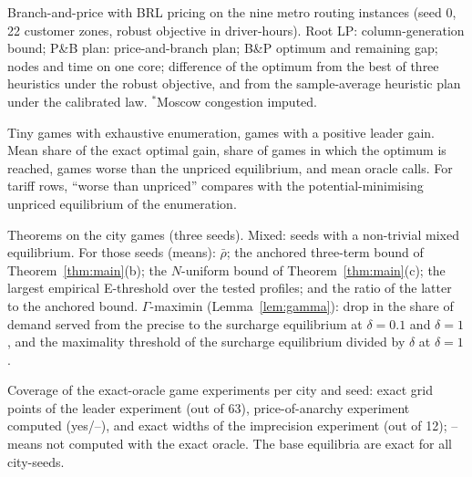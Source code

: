 \documentclass[preprint,12pt]{elsarticle}
\theoremstyle{definition}
\theoremstyle{remark}
\begin{document}
\begin{table}[h]\centering\small
\caption{Branch-and-price with BRL pricing on the nine metro routing instances (seed 0, 22 customer zones, robust objective in driver-hours). Root LP: column-generation bound; P\&B plan: price-and-branch plan; B\&P optimum and remaining gap; nodes and time on one core; difference of the optimum from the best of three heuristics under the robust objective, and from the sample-average heuristic plan under the calibrated law. $^*$Moscow congestion imputed.}\label{tab:brl-metro}
\end{table}

\begin{table}[h]\centering\small
\caption{Tiny games with exhaustive enumeration, games with a positive leader gain. Mean share of the exact optimal gain, share of games in which the optimum is reached, games worse than the unpriced equilibrium, and mean oracle calls. For tariff rows, ``worse than unpriced'' compares with the potential-minimising unpriced equilibrium of the enumeration.}\label{tab:arp-tiny}
\end{table}

\begin{table}[h]\centering\small
\caption{Theorems on the city games (three seeds). Mixed: seeds with a non-trivial mixed equilibrium. For those seeds (means): $\bar\rho$; the anchored three-term bound of Theorem~\ref{thm:main}(b); the $N$-uniform bound of Theorem~\ref{thm:main}(c); the largest empirical E-threshold over the tested profiles; and the ratio of the latter to the anchored bound. $\Gamma$-maximin (Lemma~\ref{lem:gamma}): drop in the share of demand served from the precise to the surcharge equilibrium at $\delta=0.1$ and $\delta=1$, and the maximality threshold of the surcharge equilibrium divided by $\delta$ at $\delta=1$.}\label{tab:theory}
\end{table}

\begin{table}[h]\centering\small
\caption{Coverage of the exact-oracle game experiments per city and seed: exact grid points of the leader experiment (out of 63), price-of-anarchy experiment computed (yes/--), and exact widths of the imprecision experiment (out of 12); -- means not computed with the exact oracle. The base equilibria are exact for all city-seeds.}\label{tab:coverage}
\end{table}
\end{document}
